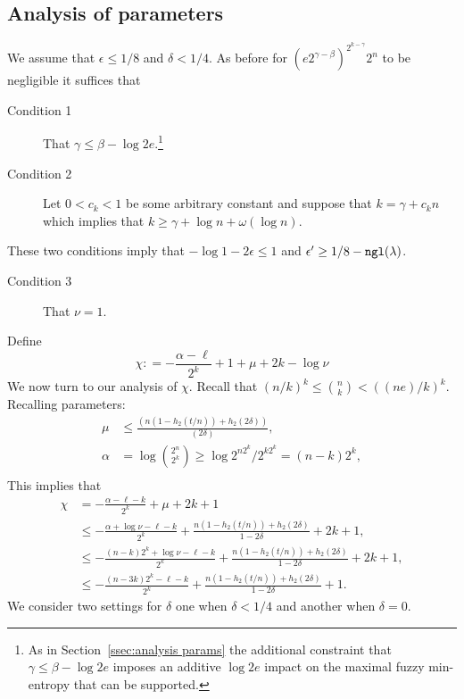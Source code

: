 \subsection{Analysis of parameters}
We assume that $\epsilon\le 1/8$ and $\delta<1/4$.  As before for  
$
\left(e2^{\gamma-\beta}\right)^{2^{k-\gamma}}2^n$ to be negligible it suffices that
\begin{description}
\item[Condition 1] That $\gamma \le \beta-\log{2e}.$\footnote{As in Section~\ref{ssec:analysis params} the additional constraint that 
$
\gamma \le \beta - \log{2e}$ 
imposes an additive $\log{2e}$ impact on the maximal fuzzy min-entropy that can be supported. 
}
\item[Condition 2] Let $0<c_k<1$ be some arbitrary constant and suppose that $k= \gamma+c_kn$ which implies that $k\ge \gamma + \log{n+\omega(\log{n})}$.
\end{description}
These two conditions imply that $-\log{1-2\epsilon}\le 1$ and $\epsilon'\ge 1/8-\mathtt{ngl}(\lambda)$.
\begin{description}
\item[Condition 3] That  $\nu = 1$.
\end{description}
Define \[\chi: =-\frac{\alpha-\ell}{2^k}+1+\mu+2k-\log{\nu}\]
We now turn to our analysis of $\chi$.  Recall that $(n/k)^k \le {n\choose k} < ((ne)/k)^k$.  Recalling parameters: 
\begin{align*}
\mu&\le \frac{(n(1-h_2(t/n)) +h_2(2\delta))}{(2\delta)},\\
\alpha &= \log{2^n\choose 2^k} \ge \log{2^{n2^k} /2^{k2^k}} = (n-k)2^k,\\
\end{align*}
This implies that 
\begin{align*}
\chi&= -\frac{\alpha-\ell-k}{2^k} + \mu +2k+1\\
&\le  -\frac{\alpha +\log{\nu}-\ell-k}{2^k} +\frac{n(1-h_2(t/n)) +h_2(2\delta)}{1-2\delta}  + 2k+1,\\
&\le - \frac{(n-k)2^k +\log{\nu}-\ell-k}{2^k} +\frac{n(1-h_2(t/n)) +h_2(2\delta)}{1-2\delta} + 2k+1,\\
&\le  -\frac{(n-3k)2^k-\ell-k}{2^k} + \frac{n(1-h_2(t/n)) +h_2(2\delta)}{1-2\delta}+1.
\end{align*}
We consider two settings for $\delta$ one when $\delta<1/4$ and another when $\delta=0$.

